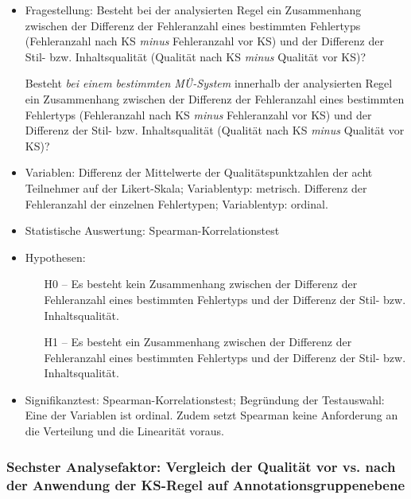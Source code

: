 \begin{itemize}
\item Fragestellung: Besteht bei der analysierten Regel ein Zusammenhang zwischen der Differenz der Fehleranzahl eines bestimmten Fehlertyps (Fehleranzahl nach KS \textit{minus} Fehleranzahl vor KS) und der Differenz der Stil- bzw. Inhaltsqualität (Qualität nach KS \textit{minus} Qualität vor KS)?

Besteht \textit{bei einem bestimmten MÜ-System} innerhalb der analysierten Regel ein Zusammenhang zwischen der Differenz der Fehleranzahl eines bestimmten Fehlertyps (Fehleranzahl nach KS \textit{minus} Fehleranzahl vor KS) und der Differenz der Stil- bzw. Inhaltsqualität (Qualität nach KS \textit{minus} Qualität vor KS)?

\item Variablen: Differenz der Mittelwerte der Qualitätspunktzahlen der acht Teilnehmer auf der Likert-Skala; Variablentyp: metrisch. Differenz der Fehleranzahl der einzelnen Fehlertypen; Variablentyp: ordinal.
\item Statistische Auswertung: Spearman-Korrelationstest
\item Hypothesen:
  \begin{itemize}[align=left]

  \item[H0 --] Es besteht kein Zusammenhang zwischen der Differenz der Fehleranzahl eines bestimmten Fehlertyps und der Differenz der Stil- bzw. Inhaltsqualität.

  \item[H1 --] Es besteht ein Zusammenhang zwischen der Differenz der Fehleranzahl eines bestimmten Fehlertyps und der Differenz der Stil- bzw. Inhaltsqualität.

  \end{itemize}
\item Signifikanztest: Spearman-Korrelationstest; Begründung der Testauswahl: Eine der Variablen ist ordinal. Zudem setzt Spearman keine Anforderung an die Verteilung und die Linearität voraus.
\end{itemize}

\subsubsection{Sechster Analysefaktor: Vergleich der Qualität vor vs. nach der Anwendung der KS-Regel auf Annotationsgruppenebene}

